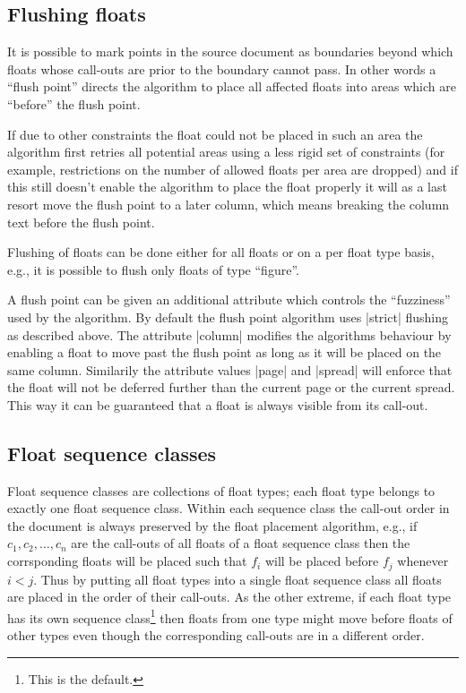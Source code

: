 \documentclass[twocolumn]{article}
\begin{document}
\ORspecial\ShowGridfalse


\subsection{Flushing floats}

It is possible to mark points in the source document as boundaries beyond
which floats whose call-outs are prior to the boundary cannot pass. In
other words a ``flush point'' directs the algorithm to place all
affected floats into areas which are ``before'' the flush point.

If due to other constraints the float could not be placed in such an
area the algorithm first retries all potential areas using a less
rigid set of constraints (for example, restrictions on the number of
allowed floats per area are dropped) and if this still doesn't enable
the algorithm to place the float properly it will as a last resort
move the flush point to a later column, which means breaking the
column text before the flush point.

Flushing of floats can be done either for all floats or on a
per float type basis, e.g., it is possible to flush only floats of
type ``figure''.

A flush point can be given an additional attribute which controls the
``fuzziness'' used by the algorithm. By default the flush point
algorithm uses |strict| flushing as described above. The attribute
|column| modifies the algorithms behaviour by enabling a float to move
past the flush point as long as it will be placed on the same
column. Similarily the attribute values |page| and |spread| will
enforce that the float will not be deferred further than the current
page or the current spread. This way it can be guaranteed that a float
is always visible from its call-out.


\subsection{Float sequence classes}

Float sequence classes are collections of float types; each float type
belongs to exactly one float sequence class. Within each sequence
class the call-out order in the document is always preserved by the
float placement algorithm, e.g., if $c_1,c_2,\ldots,c_n$ are the
call-outs of all floats of a float sequence class then the
corrsponding floats will be placed such that $f_i$ will be placed
before $f_j$ whenever $i<j$.  Thus by putting all float types into a
single float sequence class all floats are placed in the order of
their call-outs. As the other extreme, if each float type has its own
sequence class\footnote{This is the \LaTeXe{} default.} then floats
from one type might move before floats of other types even though the
corresponding call-outs are in a different order.
\end{document}
